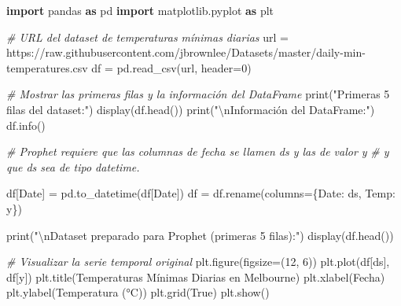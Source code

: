 \documentclass[
  11pt,
]{article}
\newenvironment{Shaded}{}{}
\newcommand{\BuiltInTok}[1]{\textcolor[rgb]{0.00,0.50,0.00}{#1}}
\newcommand{\CharTok}[1]{\textcolor[rgb]{0.25,0.44,0.63}{#1}}
\newcommand{\CommentTok}[1]{\textcolor[rgb]{0.38,0.63,0.69}{\textit{#1}}}
\newcommand{\DecValTok}[1]{\textcolor[rgb]{0.25,0.63,0.44}{#1}}
\newcommand{\ImportTok}[1]{\textcolor[rgb]{0.00,0.50,0.00}{\textbf{#1}}}
\newcommand{\NormalTok}[1]{#1}
\newcommand{\OperatorTok}[1]{\textcolor[rgb]{0.40,0.40,0.40}{#1}}
\newcommand{\StringTok}[1]{\textcolor[rgb]{0.25,0.44,0.63}{#1}}
\newcommand{\VariableTok}[1]{\textcolor[rgb]{0.10,0.09,0.49}{#1}}
\begin{document}
\begin{Shaded}
\begin{Highlighting}[]
\ImportTok{import}\NormalTok{ pandas }\ImportTok{as}\NormalTok{ pd}
\ImportTok{import}\NormalTok{ matplotlib.pyplot }\ImportTok{as}\NormalTok{ plt}

\CommentTok{\# URL del dataset de temperaturas mínimas diarias}
\NormalTok{url }\OperatorTok{=} \StringTok{\textquotesingle{}https://raw.githubusercontent.com/jbrownlee/Datasets/master/daily{-}min{-}temperatures.csv\textquotesingle{}}
\NormalTok{df }\OperatorTok{=}\NormalTok{ pd.read\_csv(url, header}\OperatorTok{=}\DecValTok{0}\NormalTok{)}

\CommentTok{\# Mostrar las primeras filas y la información del DataFrame}
\BuiltInTok{print}\NormalTok{(}\StringTok{"Primeras 5 filas del dataset:"}\NormalTok{)}
\NormalTok{display(df.head())}
\BuiltInTok{print}\NormalTok{(}\StringTok{"}\CharTok{\textbackslash{}n}\StringTok{Información del DataFrame:"}\NormalTok{)}
\NormalTok{df.info()}

\CommentTok{\# Prophet requiere que las columnas de fecha se llamen \textquotesingle{}ds\textquotesingle{} y las de valor \textquotesingle{}y\textquotesingle{}}
\CommentTok{\# y que \textquotesingle{}ds\textquotesingle{} sea de tipo datetime.}

\NormalTok{df[}\StringTok{\textquotesingle{}Date\textquotesingle{}}\NormalTok{] }\OperatorTok{=}\NormalTok{ pd.to\_datetime(df[}\StringTok{\textquotesingle{}Date\textquotesingle{}}\NormalTok{])}
\NormalTok{df }\OperatorTok{=}\NormalTok{ df.rename(columns}\OperatorTok{=}\NormalTok{\{}\StringTok{\textquotesingle{}Date\textquotesingle{}}\NormalTok{: }\StringTok{\textquotesingle{}ds\textquotesingle{}}\NormalTok{, }\StringTok{\textquotesingle{}Temp\textquotesingle{}}\NormalTok{: }\StringTok{\textquotesingle{}y\textquotesingle{}}\NormalTok{\})}

\BuiltInTok{print}\NormalTok{(}\StringTok{"}\CharTok{\textbackslash{}n}\StringTok{Dataset preparado para Prophet (primeras 5 filas):"}\NormalTok{)}
\NormalTok{display(df.head())}

\CommentTok{\# Visualizar la serie temporal original}
\NormalTok{plt.figure(figsize}\OperatorTok{=}\NormalTok{(}\DecValTok{12}\NormalTok{, }\DecValTok{6}\NormalTok{))}
\NormalTok{plt.plot(df[}\StringTok{\textquotesingle{}ds\textquotesingle{}}\NormalTok{], df[}\StringTok{\textquotesingle{}y\textquotesingle{}}\NormalTok{])}
\NormalTok{plt.title(}\StringTok{\textquotesingle{}Temperaturas Mínimas Diarias en Melbourne\textquotesingle{}}\NormalTok{)}
\NormalTok{plt.xlabel(}\StringTok{\textquotesingle{}Fecha\textquotesingle{}}\NormalTok{)}
\NormalTok{plt.ylabel(}\StringTok{\textquotesingle{}Temperatura (°C)\textquotesingle{}}\NormalTok{)}
\NormalTok{plt.grid(}\VariableTok{True}\NormalTok{)}
\NormalTok{plt.show()}
\end{Highlighting}
\end{Shaded}
\end{document}
